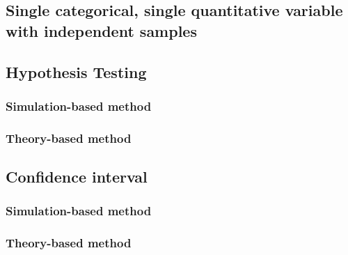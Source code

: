 \documentclass[
]{report}
\begin{document}
\hypertarget{single-categorical-single-quantitative-variable-with-independent-samples}{%
\subsection*{Single categorical, single quantitative variable with independent samples}\label{single-categorical-single-quantitative-variable-with-independent-samples}}

\hypertarget{hypothesis-testing-4}{%
\subsection*{Hypothesis Testing}\label{hypothesis-testing-4}}

\hypertarget{simulation-based-method-6}{%
\subsubsection*{Simulation-based method}\label{simulation-based-method-6}}

\hypertarget{theory-based-method-3}{%
\subsubsection*{Theory-based method}\label{theory-based-method-3}}

\hypertarget{confidence-interval-7}{%
\subsection*{Confidence interval}\label{confidence-interval-7}}

\hypertarget{simulation-based-method-7}{%
\subsubsection*{Simulation-based method}\label{simulation-based-method-7}}

\hypertarget{theory-based-method-4}{%
\subsubsection*{Theory-based method}\label{theory-based-method-4}}
\end{document}
